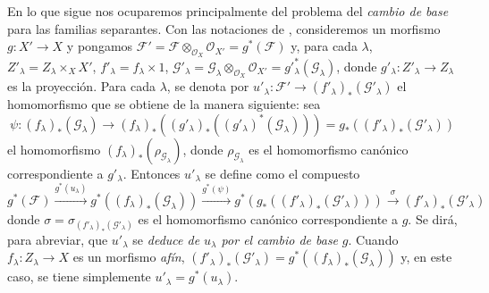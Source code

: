 \begin{env}[11.9.5]
\label{IV.11.9.5}
En lo que sigue nos ocuparemos principalmente del problema del \emph{cambio de base} para las familias separantes.
Con las notaciones de , consideremos un morfismo $g:X'\to X$ y pongamos $\mathcal F'=\mathcal F\otimes_{\mathcal O_X}\mathcal O_{X'}
=g^*(\mathcal F)$ y, para cada $\lambda$, $Z'_\lambda=Z_\lambda\times_X X'$, $f'_\lambda=f_\lambda\times 1$, $\mathcal G'_\lambda=\mathcal G_\lambda\otimes_{\mathcal O_X}
\mathcal O_{X'}=g'^*_\lambda(\mathcal G_\lambda)$, donde $g'_\lambda:Z'_\lambda\to Z_\lambda$ es la proyección.
Para cada $\lambda$, se denota por $u'_\lambda:\mathcal F'\to(f'_\lambda)_*(\mathcal G'_\lambda)$ el homomorfismo que se obtiene de la manera siguiente: sea
\[
\psi:(f_\lambda)_*(\mathcal G_\lambda)\longrightarrow
(f_\lambda)_*((g'_\lambda)_*((g'_\lambda)^*(\mathcal G_\lambda)))
=g_*((f'_\lambda)_*(\mathcal G'_\lambda))
\]
el homomorfismo $(f_\lambda)_*(\rho_{\mathcal G_\lambda})$, donde $\rho_{\mathcal G_\lambda}$ es el homomorfismo canónico  correspondiente a $g'_\lambda$.
Entonces $u'_\lambda$ se define como el compuesto
\[
g^*(\mathcal F)\xrightarrow{g^*(u_\lambda)}
g^*((f_\lambda)_*(\mathcal G_\lambda))
\xrightarrow{g^*(\psi)}g^*(g_*((f'_\lambda)_*(\mathcal G'_\lambda)))
\xrightarrow{\sigma}(f'_\lambda)_*(\mathcal G'_\lambda)
\]
donde $\sigma=\sigma_{(f'_\lambda)_*(\mathcal G'_\lambda)}$ es el homomorfismo canónico  correspondiente a $g$.
Se dirá, para abreviar, que $u'_\lambda$ se \emph{deduce de $u_\lambda$ por el cambio de base} $g$.
Cuando $f_\lambda:Z_\lambda\to X$ es un morfismo \emph{afín}, $(f'_\lambda)_*(\mathcal G'_\lambda)=g^*((f_\lambda)_*(\mathcal G_\lambda))$ y, en este caso, se tiene simplemente $u'_\lambda=g^*(u_\lambda)$.


\end{env}
